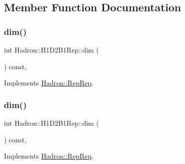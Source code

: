 \subsection{Member Function Documentation}
\mbox{\label{structHadron_1_1H1D2B1Rep_a0b9935c70773e15e4494ab8f09eb29c7}} 
\subsubsection{\texorpdfstring{dim()}{dim()}\hspace{0.1cm}{\footnotesize\ttfamily [1/5]}}
{\footnotesize\ttfamily int Hadron\+::\+H1\+D2\+B1\+Rep\+::dim (\begin{DoxyParamCaption}{ }\end{DoxyParamCaption}) const\hspace{0.3cm}{\ttfamily [inline]}, {\ttfamily [virtual]}}



Implements \mbox{\hyperlink{structHadron_1_1RepRep_a92c8802e5ed7afd7da43ccfd5b7cd92b}{Hadron\+::\+Rep\+Rep}}.

\mbox{\label{structHadron_1_1H1D2B1Rep_a0b9935c70773e15e4494ab8f09eb29c7}} 
\subsubsection{\texorpdfstring{dim()}{dim()}\hspace{0.1cm}{\footnotesize\ttfamily [2/5]}}
{\footnotesize\ttfamily int Hadron\+::\+H1\+D2\+B1\+Rep\+::dim (\begin{DoxyParamCaption}{ }\end{DoxyParamCaption}) const\hspace{0.3cm}{\ttfamily [inline]}, {\ttfamily [virtual]}}



Implements \mbox{\hyperlink{structHadron_1_1RepRep_a92c8802e5ed7afd7da43ccfd5b7cd92b}{Hadron\+::\+Rep\+Rep}}.

\mbox{\label{structHadron_1_1H1D2B1Rep_a0b9935c70773e15e4494ab8f09eb29c7}} 
